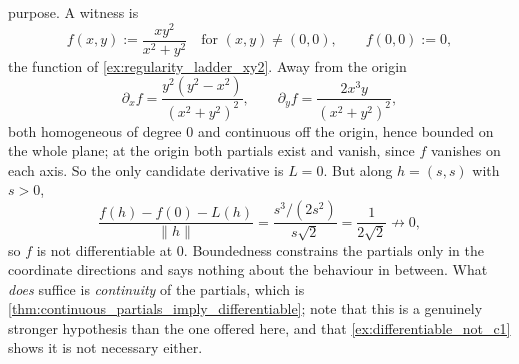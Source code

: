 \begin{exercisesolution}
\begin{enumerate}[label=\textbf{(\alph*)}]
    purpose. A witness is
    \[f(x,y) := \frac{xy^2}{x^2+y^2} \quad \text{for } (x,y)\neq(0,0), \qquad f(0,0) := 0,\]
    the function of \cref{ex:regularity_ladder_xy2}. Away from the origin
    \[\partial_xf = \frac{y^2(y^2-x^2)}{(x^2+y^2)^2}, \qquad
      \partial_yf = \frac{2x^3y}{(x^2+y^2)^2},\]
    both homogeneous of degree $0$ and continuous off the origin, hence bounded on the whole
    plane; at the origin both partials exist and vanish, since $f$ vanishes on each axis. So the
    only candidate derivative is $L = 0$. But along $h = (s,s)$ with $s > 0$,
    \[\frac{f(h)-f(0)-L(h)}{\lVert h\rVert} = \frac{s^3/(2s^2)}{s\sqrt2} = \frac{1}{2\sqrt2}
      \not\to 0,\]
    so $f$ is not differentiable at $0$. Boundedness constrains the partials only in the
    coordinate directions and says nothing about the behaviour in between. What \emph{does}
    suffice is \emph{continuity} of the partials, which is
    \cref{thm:continuous_partials_imply_differentiable}; note that this is a genuinely stronger
    hypothesis than the one offered here, and that \cref{ex:differentiable_not_c1} shows it is not
    necessary either.
\end{enumerate}
\end{exercisesolution}
